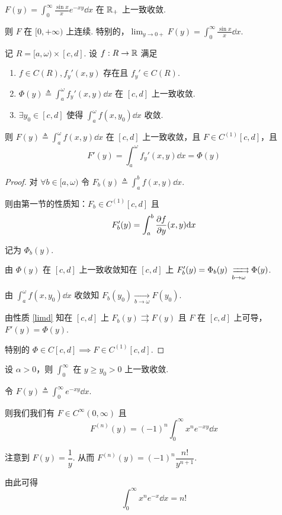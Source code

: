 \begin{example}
    $F(y)=\displaystyle\int_0^\infty\frac{\sin x}{x}e^{-xy}\dd x$ 在 $\mathbb{R}_+$ 上一致收敛.

    则 $F$ 在 $[0,+\infty)$ 上连续. 特别的，$\displaystyle\lim_{y\to 0+}F(y)=\int_0^\infty\frac{\sin x}{x}\dd x$.
\end{example}


\begin{property}
    记 $R=[a,\omega)\times [c,d]$. 设 $f:R\to\mathbb{R}$ 满足

    \begin{enumerate}
        \item $f\in C(R),f_y'(x,y)$ 存在且 $f_y'\in C(R)$.
        
        \item $\Phi(y)\triangleq\displaystyle\int_a^\omega f_y'(x,y)\dd x$ 在 $[c,d]$ 上一致收敛.
        
        \item $\exists y_0\in[c,d]$ 使得 $\displaystyle\int_a^\omega f(x,y_0)\dd x$ 收敛.
    \end{enumerate}

    则 $F(y)\triangleq\displaystyle\int_a^\omega f(x,y)\dd x$ 在 $[c,d]$ 上一致收敛，且 $F\in C^{(1)}[c,d]$，且
$$
F'(y)=\int_a^\omega f_y'(x,y)\dd x=\Phi(y)
$$
\end{property}
\begin{proof}
    对 $\forall b\in [a,\omega)$ 令 $F_b(y)\triangleq\displaystyle\int_a^b f(x,y)\dd x$.

    则由第一节的性质知：$F_b\in C^{(1)}[c,d]$ 且
$$
F_b'(y)=\int_a^b\frac{\partial{f}}{\partial{y}}(x,y)\mathrm{d} x
$$

    记为 $\Phi_b(y)$.

    由 $\Phi(y)$ 在 $[c,d]$ 上一致收敛知在 $[c,d]$ 上 $F_b'(y)=\Phi_b(y)\xrightrightarrows[b\to\omega]{}\Phi(y)$.

    由 $\displaystyle\int_a^\omega f(x,y_0)\dd x$ 收敛知 $F_b(y_0)\xrightarrow[b\to\omega]{}F(y_0)$.

    由性质 \ref{limd} 知在 $[c,d]$ 上 $F_b(y)\rightrightarrows F(y)$ 且 $F$ 在 $[c,d]$ 上可导，$F'(y)=\Phi(y)$.

    特别的 $\Phi\in C[c,d]\implies F\in C^{(1)}[c,d]$.
\end{proof}

\begin{example}
    设 $\alpha>0$，则 $\displaystyle\int_0^\infty$ 在 $y\ge y_0>0$ 上一致收敛.

    令 $F(y)\triangleq\displaystyle\int_0^\infty e^{-xy}\dd x$.

    则我们我们有 $F\in C^\infty(0,\infty)$ 且
$$
F^{(n)}(y)=(-1)^n\int_0^\infty x^ne^{-xy}\dd x
$$

    注意到 $F(y)=\dfrac{1}{y}$. 从而 $F^{(n)}(y)=(-1)^n\dfrac{n!}{y^{n+1}}$.

    由此可得
$$
\int_0^\infty x^ne^{-x}\dd x=n!
$$
\end{example}

